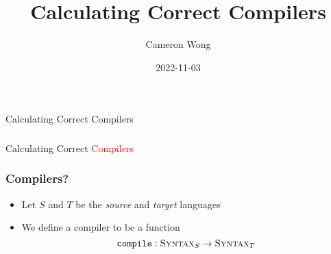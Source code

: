 \documentclass[usenames,dvipsnames]{beamer}
\title[]{Calculating Correct Compilers} %
\author{Cameron Wong} %
\institute[CS-252R]{CS-252R}
\date{2022-11-03} %
\newcommand{\compile}{\texttt{compile}}
\newcommand{\syn}{\textsc{Syntax}}
\begin{document}
\begin{frame}
\titlepage %
\end{frame}




\begin{frame}
  \frametitle{}

  \begin{center}
    \Huge Calculating Correct Compilers
  \end{center}
\end{frame}


\begin{frame}
  \frametitle{}

  \begin{center}
    \Huge Calculating Correct \textcolor{red}{Compilers}
  \end{center}
\end{frame}


\begin{frame}
  \frametitle{Compilers?}

  \begin{itemize}
    \item Let $S$ and $T$ be the \emph{source} and \emph{target} languages
    \item We define a compiler to be a function
      \begin{equation}
        \compile : \syn_{S} \rightarrow \syn_{T}
      \end{equation}
  \end{itemize}
\end{frame}
\end{document}
